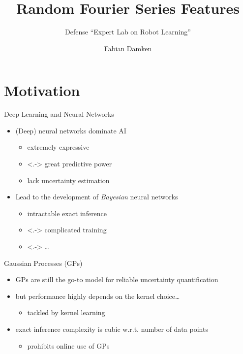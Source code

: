\documentclass[
	USenglish,
	aspectratio=43,
	color={accentcolor=1c},
	logo=true,
	colorframetitle=true,
	hyperref={pdfpagelabels=true},
]{tudabeamer}
\title{Random Fourier Series Features}
\subtitle{Defense \enquote{Expert Lab on Robot Learning}}
\author{Fabian Damken}
\institute{Intelligent Autonomous Systems}
\date{\formatdate{20}{05}{2022}}
\begin{document}
	\maketitle

	\section{Motivation}
		\begin{frame}{Deep Learning and Neural Networks}
			\begin{itemize}
				\item<+-> (Deep) neural networks dominate AI
					\begin{itemize}
						\item<+-> extremely expressive
						\item<.-> great predictive power
						\item<+-> lack uncertainty estimation
					\end{itemize}
				\item<+-> Lead to the development of \emph{Bayesian} neural networks
					\begin{itemize}
						\item<+-> intractable exact inference
						\item<.-> complicated training
						\item<.-> \dots
					\end{itemize}
			\end{itemize}
		\end{frame}

		\begin{frame}{Gaussian Processes (GPs)}
			\begin{itemize}
				\item<+-> GPs are still the go-to model for reliable uncertainty quantification
				\item<+-> but performance highly depends on the kernel choice\dots
					\begin{itemize}
						\item tackled by kernel learning
					\end{itemize}
				\item<+-> exact inference complexity is cubic w.r.t. number of data points
					\begin{itemize}
						\item prohibits online use of GPs
					\end{itemize}
			\end{itemize}
		\end{frame}
\end{document}
